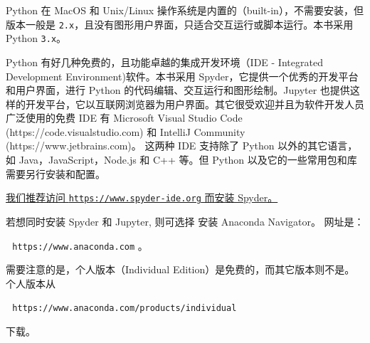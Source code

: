 \documentclass[main.tex]{subfiles}
\begin{document}
Python 在 MacOS 和 Unix/Linux 操作系统是内置的（built-in），不需要安装，但版本一般是 \texttt{2.x}，且没有图形用户界面，只适合交互运行或脚本运行。本书采用 Python \texttt{3.x}。

Python 有好几种免费的，且功能卓越的集成开发环境（IDE - Integrated Development Environment)软件。本书采用 Spyder，它提供一个优秀的开发平台和用户界面，进行 Python 的代码编辑、交互运行和图形绘制。Jupyter 也提供这样的开发平台，它以互联网浏览器为用户界面。其它很受欢迎并且为软件开发人员广泛使用的免费 IDE 有 Microsoft Visual Studio Code (https://code.visualstudio.com) 和 IntelliJ Community (https://www.jetbrains.com)。
这两种 IDE 支持除了 Python 以外的其它语言，如 Java，JavaScript，Node.js 和 C++ 等。但 Python 以及它的一些常用包和库需要另行安装和配置。  


\underline{我们推荐访问
\texttt{https://www.spyder-ide.org} 而安装 Spyder。
}

若想同时安装 Spyder 和 Jupyter, 则可选择 
安装 Anaconda Navigator。 网址是：

\,\,\,\,\texttt{https://www.anaconda.com} 。

\noindent 需要注意的是，个人版本（Individual Edition）是免费的，而其它版本则不是。个人版本从

\,\,\,\,\texttt{https://www.anaconda.com/products/individual} 

\noindent 下载。
\end{document}
